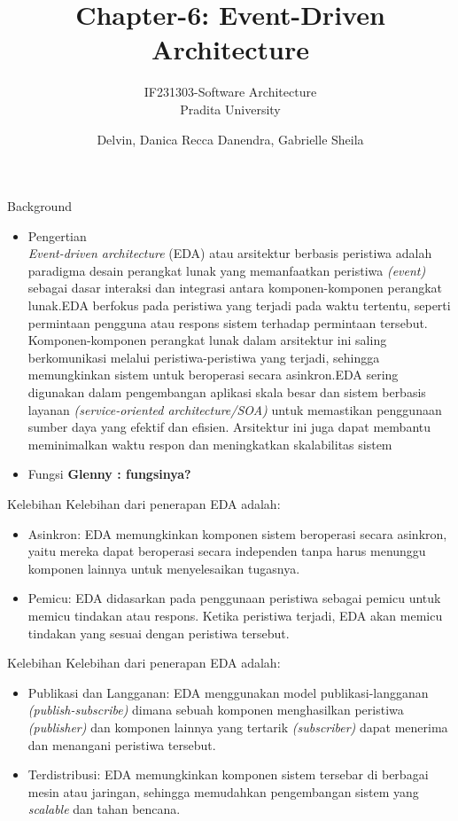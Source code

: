 \documentclass{beamer}
\title{Chapter-6: Event-Driven Architecture}
\subtitle{IF231303-Software Architecture\\Pradita University}
\author{Delvin, Danica Recca Danendra, Gabrielle Sheila}
\begin{document}
	
	\begin{frame}[plain]
		\maketitle
	\end{frame}
	

	
	\begin{frame}{Background}
		\begin{itemize}
			\item Pengertian
			\\\textit{Event-driven architecture} (EDA) atau arsitektur berbasis peristiwa adalah paradigma desain perangkat lunak yang memanfaatkan peristiwa \textit{(event)} sebagai dasar interaksi dan integrasi antara komponen-komponen perangkat lunak.EDA berfokus pada peristiwa yang terjadi pada waktu tertentu, seperti permintaan pengguna atau respons sistem terhadap permintaan tersebut. Komponen-komponen perangkat lunak dalam arsitektur ini saling berkomunikasi melalui peristiwa-peristiwa yang terjadi, sehingga memungkinkan sistem untuk beroperasi secara asinkron.EDA sering digunakan dalam pengembangan aplikasi skala besar dan sistem berbasis layanan \textit{ (service-oriented architecture/SOA)} untuk memastikan penggunaan sumber daya yang efektif dan efisien. Arsitektur ini juga dapat membantu meminimalkan waktu respon dan meningkatkan skalabilitas sistem
			\item Fungsi
			\textbf{Glenny : fungsinya?}
		\end{itemize}
	\end{frame}
	
	\begin{frame}{Kelebihan}
		Kelebihan dari penerapan EDA adalah:
		\begin{itemize}
		\item Asinkron: EDA memungkinkan komponen sistem beroperasi secara asinkron, yaitu mereka dapat beroperasi secara independen tanpa harus menunggu komponen lainnya untuk menyelesaikan tugasnya.	
		\item Pemicu: EDA didasarkan pada penggunaan peristiwa sebagai pemicu untuk memicu tindakan atau respons. Ketika peristiwa terjadi, EDA akan memicu tindakan yang sesuai dengan peristiwa tersebut.	
		\end{itemize}
	\end{frame}

		\begin{frame}{Kelebihan}
		Kelebihan dari penerapan EDA adalah:
		\begin{itemize}
		\item Publikasi dan Langganan: EDA menggunakan model publikasi-langganan \textit{(publish-subscribe)} dimana sebuah komponen menghasilkan peristiwa \textit{(publisher)} dan komponen lainnya yang tertarik \textit{(subscriber)} dapat menerima dan menangani peristiwa tersebut.	
		\item Terdistribusi: EDA memungkinkan komponen sistem tersebar di berbagai mesin atau jaringan, sehingga memudahkan pengembangan sistem yang \textit{scalable} dan tahan bencana.
		\end{itemize}
	\end{frame}
	
\end{document}
